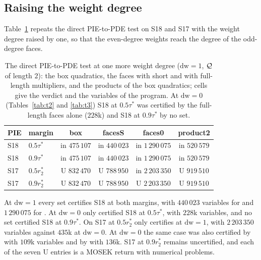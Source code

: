 \subsection{Raising the weight degree}\label{sec:t4}

Table~\ref{tab:t4} repeats the direct PIE-to-PDE test on S18 and S17 with the weight degree raised by one, so that the even-degree weights reach the degree of the odd-degree faces.

\begin{table}[h]\centering\scriptsize
\setlength{\tabcolsep}{4pt}
\begin{tabular}{llcccc}
\toprule
PIE & margin & box & facesS & faces0 & product2 \\
\midrule
S18 & $0.5\tau^*$ & in $475\,107$ & in $440\,023$ & in $1\,290\,075$ & in $520\,579$ \\
S18 & $0.9\tau^*$ & in $475\,107$ & in $440\,023$ & in $1\,290\,075$ & in $520\,579$ \\
S17 & $0.5r_2^*$ & U $832\,470$ & U $788\,950$ & in $2\,203\,350$ & U $919\,510$ \\
S17 & $0.9r_2^*$ & U $832\,470$ & U $788\,950$ & U $2\,203\,350$ & U $919\,510$ \\
\bottomrule
\end{tabular}
\caption{The direct PIE-to-PDE test at one more weight degree ($\mathrm{dw}=1$, $\mathcal{Q}$ of length $2$): the box quadratics, the faces with short and with full-length multipliers, and the products of the box quadratics; cells give the verdict and the variables of the program. At $\mathrm{dw}=0$ (Tables~\ref{tab:t2} and \ref{tab:t3}) S18 at $0.5\tau^*$ was certified by the full-length faces alone ($228$k) and S18 at $0.9\tau^*$ by no set.}\label{tab:t4}
\end{table}

At $\mathrm{dw}=1$ every set certifies S18 at both margins, with $440\,023$ variables for  and $1\,290\,075$ for . At $\mathrm{dw}=0$ only  certified S18 at $0.5\tau^*$, with $228$k variables, and no set certified S18 at $0.9\tau^*$. On S17 at $0.5r_2^*$ only  certifies at $\mathrm{dw}=1$, with $2\,203\,350$ variables against $435$k at $\mathrm{dw}=0$. At $\mathrm{dw}=0$ the same case was also certified by  with $109$k variables and by  with $136$k. S17 at $0.9r_2^*$ remains uncertified, and each of the seven U entries is a MOSEK return with numerical problems.

